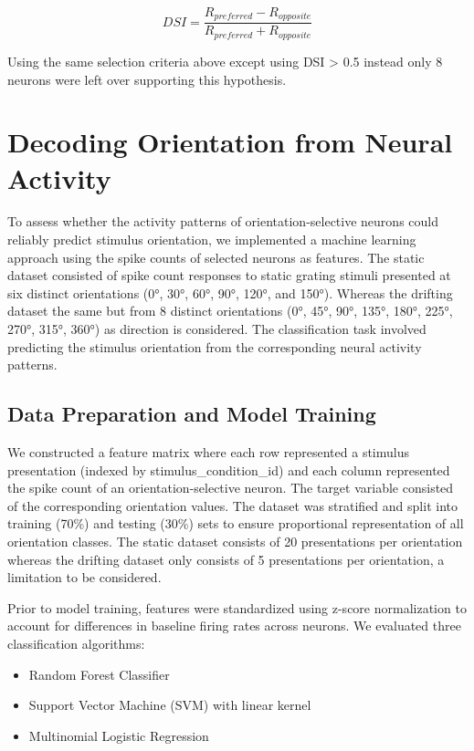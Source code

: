 \documentclass[10pt,twocolumn]{article}
\begin{document}
\begin{equation}
DSI = \frac{R_{preferred} - R_{opposite}}{R_{preferred} + R_{opposite}}
\end{equation}

Using the same selection criteria above except using DSI > 0.5 instead only 8 neurons were left over supporting this hypothesis.

\section{Decoding Orientation from Neural Activity}

To assess whether the activity patterns of orientation-selective neurons could reliably predict stimulus orientation, we implemented a machine learning approach using the spike counts of selected neurons as features. The static dataset consisted of spike count responses to static grating stimuli presented at six distinct orientations (0°, 30°, 60°, 90°, 120°, and 150°). Whereas the drifting dataset the same but from 8 distinct orientations (0°, 45°, 90°, 135°, 180°, 225°, 270°, 315°, 360°) as direction is considered. The classification task involved predicting the stimulus orientation from the corresponding neural activity patterns.

\subsection{Data Preparation and Model Training}
We constructed a feature matrix where each row represented a stimulus presentation (indexed by stimulus\_condition\_id) and each column represented the spike count of an orientation-selective neuron. The target variable consisted of the corresponding orientation values. The dataset was stratified and split into training (70\%) and testing (30\%) sets to ensure proportional representation of all orientation classes. The static dataset consists of 20 presentations per orientation whereas the drifting dataset only consists of 5 presentations per orientation, a limitation to be considered.

Prior to model training, features were standardized using z-score normalization to account for differences in baseline firing rates across neurons. We evaluated three classification algorithms:

\begin{itemize}
    \item Random Forest Classifier
    \item Support Vector Machine (SVM) with linear kernel
    \item Multinomial Logistic Regression
\end{itemize}
\end{document}
